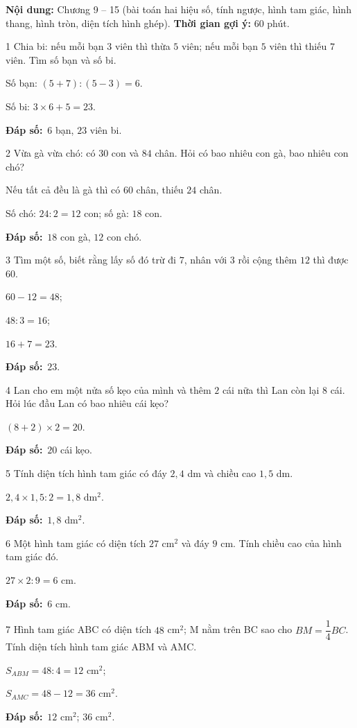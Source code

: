 \documentclass[11pt]{article}
\newif\ifsol \solfalse
\providecommand{\AnsWord}{Đáp số}
\newcommand{\dapso}[1]{\par\textbf{\AnsWord:}\ #1}
\newcommand{\probsol}[1]{%
  \begin{lrbox}{\solmeasure}\begin{minipage}{\dimexpr\linewidth-24pt\relax}#1\end{minipage}\end{lrbox}%
  \ifsol
    \begin{solbox}#1\end{solbox}%
  \else
    \setlength{\solht}{\dimexpr\ht\solmeasure+\dp\solmeasure+0.85cm\relax}%
    \ifdim\solht<1.35cm\setlength{\solht}{1.35cm}\fi
    \begin{tcolorbox}[colback=white,colframe=Line,boxrule=0.8pt,arc=5pt,
      left=8pt,right=8pt,top=4pt,bottom=4pt,height=\solht]{\footnotesize\color{Slate}\itshape\WorkWord}\end{tcolorbox}%
  \fi}
\newcommand{\gap}{\vspace{0.3cm}}
\def\WorkWord{Bài làm:}
\def\AnsWord{Đáp số}
\begin{document}
\begin{knowbox}
\textbf{Nội dung:} Chương 9 -- 15 (bài toán hai hiệu số, tính ngược, hình tam giác, hình thang, hình tròn, diện tích hình ghép). \quad \textbf{Thời gian gợi ý:} $60$ phút.
\end{knowbox}
\gap
\begin{probbox}{1}{\relax}
Chia bi: nếu mỗi bạn $3$ viên thì thừa $5$ viên; nếu mỗi bạn $5$ viên thì thiếu $7$ viên. Tìm số bạn và số bi.
\end{probbox}
\probsol{
Số bạn: $(5+7):(5-3)=6$.\par Số bi: $3\times6+5=23$.
\dapso{$6$ bạn, $23$ viên bi.}}
\gap
\begin{probbox}{2}{\relax}
Vừa gà vừa chó: có $30$ con và $84$ chân. Hỏi có bao nhiêu con gà, bao nhiêu con chó?
\end{probbox}
\probsol{
Nếu tất cả đều là gà thì có $60$ chân, thiếu $24$ chân.\par Số chó: $24:2=12$ con; số gà: $18$ con.
\dapso{$18$ con gà, $12$ con chó.}}
\gap
\begin{probbox}{3}{\relax}
Tìm một số, biết rằng lấy số đó trừ đi $7$, nhân với $3$ rồi cộng thêm $12$ thì được $60$.
\end{probbox}
\probsol{
$60-12=48$;\par $48:3=16$;\par $16+7=23$.
\dapso{$23$.}}
\gap
\begin{probbox}{4}{\relax}
Lan cho em một nửa số kẹo của mình và thêm $2$ cái nữa thì Lan còn lại $8$ cái. Hỏi lúc đầu Lan có bao nhiêu cái kẹo?
\end{probbox}
\probsol{
$(8+2)\times2=20$.
\dapso{$20$ cái kẹo.}}
\gap
\begin{probbox}{5}{\relax}
Tính diện tích hình tam giác có đáy $2{,}4$ dm và chiều cao $1{,}5$ dm.
\end{probbox}
\probsol{
$2{,}4\times1{,}5:2=1{,}8$ dm$^2$.
\dapso{$1{,}8$ dm$^2$.}}
\gap
\begin{probbox}{6}{\relax}
Một hình tam giác có diện tích $27$ cm$^2$ và đáy $9$ cm. Tính chiều cao của hình tam giác đó.
\end{probbox}
\probsol{
$27\times2:9=6$ cm.
\dapso{$6$ cm.}}
\gap
\begin{probbox}{7}{\relax}
Hình tam giác ABC có diện tích $48$ cm$^2$; M nằm trên BC sao cho $BM=\dfrac14BC$. Tính diện tích hình tam giác ABM và AMC.
\end{probbox}
\probsol{
$S_{ABM}=48:4=12$ cm$^2$;\par $S_{AMC}=48-12=36$ cm$^2$.
\dapso{$12$ cm$^2$; $36$ cm$^2$.}}
\end{document}
